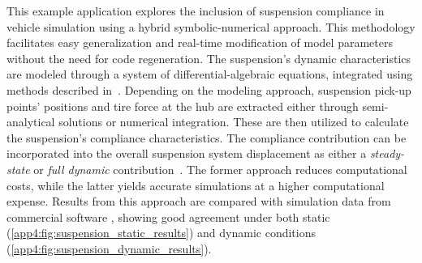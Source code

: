 This example application explores the inclusion of suspension compliance in vehicle simulation using a hybrid symbolic-numerical approach. This methodology facilitates easy generalization and real-time modification of model parameters without the need for code regeneration. The suspension's dynamic characteristics are modeled through a system of differential-algebraic equations, integrated using methods described in~\cite{larcher2024symbolic}. Depending on the modeling approach, suspension pick-up points' positions and tire force at the hub are extracted either through semi-analytical solutions or numerical integration. These are then utilized to calculate the suspension's compliance characteristics. The compliance contribution can be incorporated into the overall suspension system displacement as either a \emph{steady-state} or \emph{full dynamic} contribution~\cite{larcher2024symbolic}. The former approach reduces computational costs, while the latter yields accurate simulations at a higher computational expense. Results from this approach are compared with simulation data from commercial software \Ansys{}, showing good agreement under both static (\figurename{}\ref{app4:fig:suspension_static_results}) and dynamic conditions (\figurename{}\ref{app4:fig:suspension_dynamic_results}).




